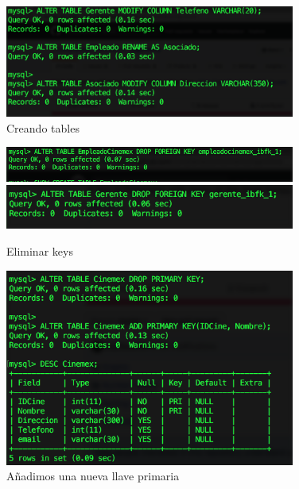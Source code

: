 \documentclass[12pt, fleqn]{article}                             %
\begin{document}
        \begin{figure}[h]
            \centering
            \includegraphics[width=0.85\textwidth]{BD2Reporte6}
            \caption{Creando tables}
        \end{figure}


        \begin{figure}[h]
            \centering
            \includegraphics[width=0.85\textwidth]{BD2Reporte9}
            \includegraphics[width=0.85\textwidth]{BD2Reporte10}
            \caption{Eliminar keys}
        \end{figure}



        \begin{figure}[h]
            \centering
            \includegraphics[width=0.85\textwidth]{BD2Reporte11}
            \caption{Añadimos una nueva llave primaria}
        \end{figure}
\end{document}
